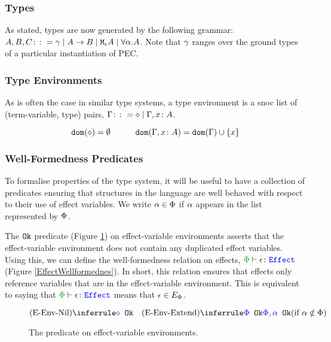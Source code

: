 \subsubsection{Types}
As stated, types are now generated by the following grammar: $ A, B, C \gens \ground \mid \ab \mid \mea \mid \all{\a}{A}$. Note that $\g$ ranges over the ground types of a particular instantiation of PEC.


  
\subsubsection{Type Environments}
As is often the case in similar type systems, a type environment is a snoc list of (term-variable, type) pairs, $\G \gens \nil \mid \gax$.

\begin{framed}
    \begin{definition}
        \[
        \dom{\nil} = \emptyset
        \quad\quad\quad
        \dom{\gax} =  \dom{\G}  \cup \left\{x \right\}
    \]
    
    \end{definition}      
\end{framed}


\subsubsection{Well-Formedness Predicates}


To formalise properties of the type system, it will be useful to have a collection of predicates ensuring that structures in the language are well behaved with respect to their use of effect variables. We write $\a \in \P$ if $\a$ appears in the list represented by $\P$.

The $\okt$ predicate (Figure \ref{EffectEnvOk}) on effect-variable environments asserts that the effect-variable environment does not contain any duplicated effect variables. Using this, we can define the well-formedness relation on effects, $\wellformedeffect{\P}{\e}$ (Figure \ref{EffectWellformednes}). In short, this relation ensures that effects only reference variables that are in the effect-variable environment. This is equivalent to saying that $\wellformedeffect{\P}{\e}$ means that $\e\in E_\P$.

\begin{figure}[H]
    \centering
    \begin{framed}
        \[
    \ntreerulez{\pnil}{\ok{\nil}}
\quad
    \condtreeruleI{\pextend}{\ok{\P}}{\ok{\P, \a}}{\a\notin \P}
\]
    \end{framed}
    
    \caption{The \okt\s predicate on effect-variable environments.}
    \label{EffectEnvOk}
\end{figure}


